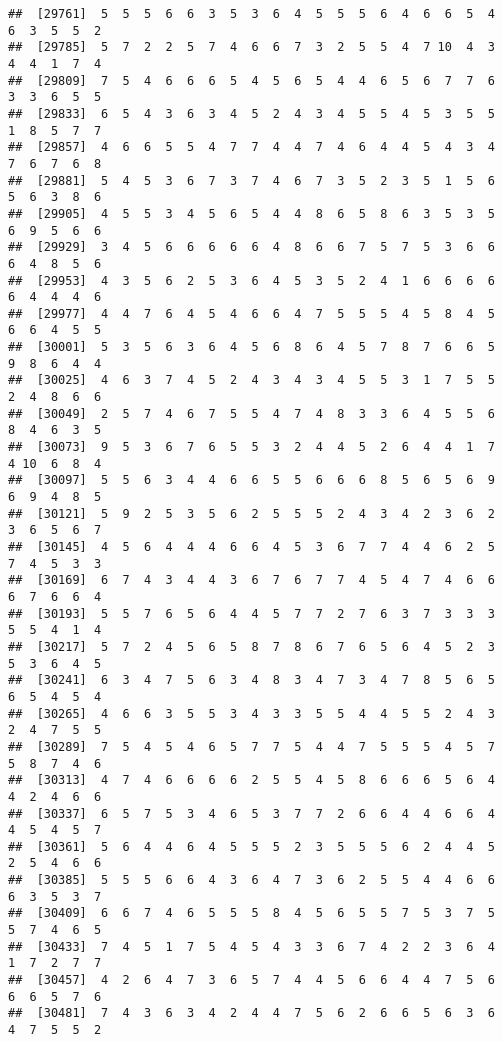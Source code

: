 \documentclass[
]{book}
\begin{document}
\begin{verbatim}
##  [29761]  5  5  5  6  6  3  5  3  6  4  5  5  5  6  4  6  6  5  4  6  3  5  5  2
##  [29785]  5  7  2  2  5  7  4  6  6  7  3  2  5  5  4  7 10  4  3  4  4  1  7  4
##  [29809]  7  5  4  6  6  6  5  4  5  6  5  4  4  6  5  6  7  7  6  3  3  6  5  5
##  [29833]  6  5  4  3  6  3  4  5  2  4  3  4  5  5  4  5  3  5  5  1  8  5  7  7
##  [29857]  4  6  6  5  5  4  7  7  4  4  7  4  6  4  4  5  4  3  4  7  6  7  6  8
##  [29881]  5  4  5  3  6  7  3  7  4  6  7  3  5  2  3  5  1  5  6  5  6  3  8  6
##  [29905]  4  5  5  3  4  5  6  5  4  4  8  6  5  8  6  3  5  3  5  6  9  5  6  6
##  [29929]  3  4  5  6  6  6  6  6  4  8  6  6  7  5  7  5  3  6  6  6  4  8  5  6
##  [29953]  4  3  5  6  2  5  3  6  4  5  3  5  2  4  1  6  6  6  6  6  4  4  4  6
##  [29977]  4  4  7  6  4  5  4  6  6  4  7  5  5  5  4  5  8  4  5  6  6  4  5  5
##  [30001]  5  3  5  6  3  6  4  5  6  8  6  4  5  7  8  7  6  6  5  9  8  6  4  4
##  [30025]  4  6  3  7  4  5  2  4  3  4  3  4  5  5  3  1  7  5  5  2  4  8  6  6
##  [30049]  2  5  7  4  6  7  5  5  4  7  4  8  3  3  6  4  5  5  6  8  4  6  3  5
##  [30073]  9  5  3  6  7  6  5  5  3  2  4  4  5  2  6  4  4  1  7  4 10  6  8  4
##  [30097]  5  5  6  3  4  4  6  6  5  5  6  6  6  8  5  6  5  6  9  6  9  4  8  5
##  [30121]  5  9  2  5  3  5  6  2  5  5  5  2  4  3  4  2  3  6  2  3  6  5  6  7
##  [30145]  4  5  6  4  4  4  6  6  4  5  3  6  7  7  4  4  6  2  5  7  4  5  3  3
##  [30169]  6  7  4  3  4  4  3  6  7  6  7  7  4  5  4  7  4  6  6  6  7  6  6  4
##  [30193]  5  5  7  6  5  6  4  4  5  7  7  2  7  6  3  7  3  3  3  5  5  4  1  4
##  [30217]  5  7  2  4  5  6  5  8  7  8  6  7  6  5  6  4  5  2  3  5  3  6  4  5
##  [30241]  6  3  4  7  5  6  3  4  8  3  4  7  3  4  7  8  5  6  5  6  5  4  5  4
##  [30265]  4  6  6  3  5  5  3  4  3  3  5  5  4  4  5  5  2  4  3  2  4  7  5  5
##  [30289]  7  5  4  5  4  6  5  7  7  5  4  4  7  5  5  5  4  5  7  5  8  7  4  6
##  [30313]  4  7  4  6  6  6  6  2  5  5  4  5  8  6  6  6  5  6  4  4  2  4  6  6
##  [30337]  6  5  7  5  3  4  6  5  3  7  7  2  6  6  4  4  6  6  4  4  5  4  5  7
##  [30361]  5  6  4  4  6  4  5  5  5  2  3  5  5  5  6  2  4  4  5  2  5  4  6  6
##  [30385]  5  5  5  6  6  4  3  6  4  7  3  6  2  5  5  4  4  6  6  6  3  5  3  7
##  [30409]  6  6  7  4  6  5  5  5  8  4  5  6  5  5  7  5  3  7  5  5  7  4  6  5
##  [30433]  7  4  5  1  7  5  4  5  4  3  3  6  7  4  2  2  3  6  4  1  7  2  7  7
##  [30457]  4  2  6  4  7  3  6  5  7  4  4  5  6  6  4  4  7  5  6  6  6  5  7  6
##  [30481]  7  4  3  6  3  4  2  4  4  7  5  6  2  6  6  5  6  3  6  4  7  5  5  2

\end{verbatim}
\end{document}
